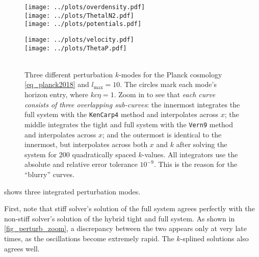 \documentclass[10pt,a4paper]{article}
\begin{document}
\begin{figure}[b]
\begin{minipage}{0.49\textwidth}
\texttt{[image: ../plots/overdensity.pdf]} \\
\texttt{[image: ../plots/ThetalN2.pdf]} \\
\texttt{[image: ../plots/potentials.pdf]} \\
\end{minipage}
\hfill
\begin{minipage}{0.49\textwidth}
\texttt{[image: ../plots/velocity.pdf]} \\
\texttt{[image: ../plots/ThetaP.pdf]} \\
 \\ %
\end{minipage}
\caption{%
	Three different perturbation $k$-modes for the Planck cosmology \eqref{eq_planck2018} and $l_\text{max}=10$.
	The circles mark each mode's horizon entry, where $k c \eta = 1$.
	Zoom in to see that \textit{each curve consists of three overlapping sub-curves}:
	the innermost integrates the full system with the \texttt{KenCarp4} method and interpolates across $x$;
	the middle integrates the tight and full system with the \texttt{Vern9} method and interpolates across $x$; and
	the outermost is identical to the innermost, but interpolates across both $x$ and $k$ after solving the system for $200$ quadratically spaced $k$-values.
	All integrators use the absolute and relative error tolerance $10^{-9}$.
	This is the reason for the ``blurry'' curves.
}
\label{fig_perturb_all}
\end{figure}%

 shows three integrated perturbation modes.

First, note that stiff solver's solution of the full system
agrees perfectly with the non-stiff solver's solution of the hybrid tight and full system.
As shown in \cref{fig_perturb_zoom}, a discrepancy between the two appears only at very late times, as the oscillations become extremely rapid.
The $k$-splined solutions also agrees well.
\end{document}
